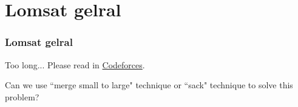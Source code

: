 \section{Lomsat gelral}

\begin{frame}
\frametitle{Lomsat gelral}
\begin{problem}
Too long... Please read in \href{https://codeforces.com/problemset/problem/600/E}{Codeforces}.
\end{problem}

Can we use ``merge small to large" technique or ``sack" technique to solve this problem?
\end{frame}